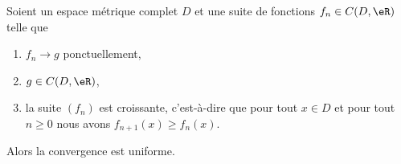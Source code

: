 \begin{theorem} \label{ThoUFPLEZh}
    Soient un espace métrique complet \( D\) et une suite de fonctions \( f_n\in C(D,\eR)\) telle que
    \begin{enumerate}
        \item
            \( f_n\to g\) ponctuellement,
        \item
            \( g\in C(D,\eR)\),
        \item
            la suite \( (f_n)\) est croissante, c'est-à-dire que pour tout \( x\in D\) et pour tout \( n\geq 0\) nous avons \( f_{n+1}(x)\geq f_n(x)\).
    \end{enumerate}
    Alors la convergence est uniforme.
\end{theorem}

